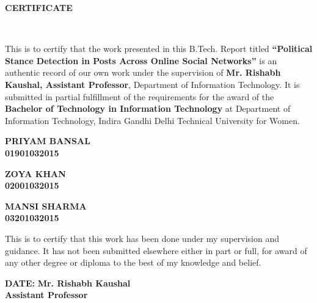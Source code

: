\documentclass[a4paper,11pt]{article}
\begin{document}
\newpage
{\LARGE \bfseries CERTIFICATE}
\setcounter{page}{1}
\vspace*{5mm}
\medskip\\
\begin{spacing}{1.5}
This is to certify that the work presented in this B.Tech. Report titled \textbf{“Political Stance Detection in Posts Across Online Social Networks”} is an authentic record of our own work under the supervision of \textbf{Mr. Rishabh Kaushal, Assistant Professor}, Department of Information Technology. It is submitted in partial fulfillment of the requirements for the award of the \textbf{Bachelor of Technology in Information Technology} at Department of Information Technology, Indira Gandhi Delhi Technical University for Women.

\vspace*{1.70cm}
{\hspace*{\fill} {\textbf{PRIYAM BANSAL\\\hspace*{\fill}01901032015}}}

\vspace*{0.05cm}
{\hspace*{\fill} {\textbf{ZOYA KHAN\\\hspace*{\fill}02001032015}}}

\vspace*{0.05cm}
{\hspace*{\fill} {\textbf{MANSI SHARMA\\\hspace*{\fill}03201032015}}}

\vspace*{1.25cm}
{This is to certify that this work has been done under my supervision and guidance. It has not been submitted elsewhere either in part or full, for award of any other degree or diploma to the best of my knowledge and belief.}

\vspace*{2.5cm}
{\textbf{DATE:}\hspace*{\fill} {\textbf{Mr. Rishabh Kaushal\\\hspace*{\fill}Assistant Professor}}}
\end{spacing}
\end{document}

